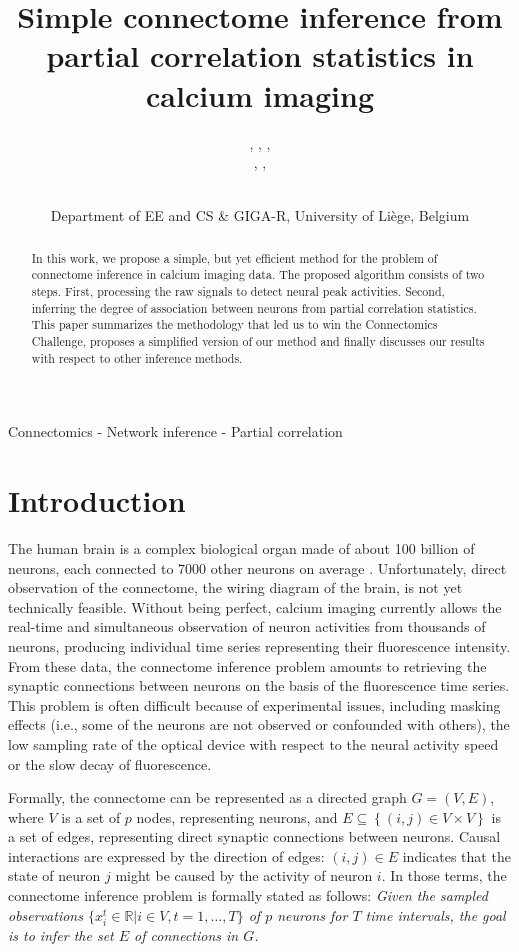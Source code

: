 \documentclass[wcp]{jmlr}
\title{Simple connectome inference from partial correlation statistics in calcium imaging}
\author{\Name{Antonio Sutera},
   \Name{Arnaud Joly},
   \Name{Vincent François-Lavet}, \Email{a.sutera@ulg.ac.be}\\
   \Name{Zixiao Aaron Qiu},
   \Name{Gilles Louppe},
   \Name{Damien Ernst}\and\Name{Pierre Geurts}
    \\
   \addr Department of EE and CS \& GIGA-R, University of Li\`ege, Belgium}
\begin{document}
\maketitle

\vspace{-0.8cm}
\begin{abstract}
In this work, we propose a simple, but yet efficient method for the problem of
connectome inference in calcium imaging data. The proposed algorithm consists of
two steps. First, processing the raw signals to detect neural peak activities.
Second, inferring the degree of association between neurons from partial
correlation statistics. This paper summarizes the methodology that led us to
win the Connectomics Challenge, proposes a simplified version of our method and
finally discusses our results with respect to other inference methods.
\end{abstract}

\begin{keywords}
Connectomics - Network inference - Partial correlation
\end{keywords}


\section{Introduction}\label{sec:intro}

The human brain is a complex biological
organ made of about 100 billion of neurons, each connected to 7000 other neurons on
average \citep{pakkenberg2003aging}. Unfortunately, direct observation of the connectome, the wiring
diagram of the brain, is not yet technically feasible. Without being perfect,
calcium imaging currently allows the real-time and simultaneous observation of
neuron activities from thousands of neurons, producing individual time series
representing their fluorescence intensity. From these data, the connectome
inference problem amounts to retrieving the synaptic connections between
neurons on the basis of the fluorescence time series. This
problem is often difficult because of experimental issues, including
masking effects (i.e., some of the neurons are not observed or confounded with others), the low sampling rate of the optical device with respect to the
neural activity speed or the slow decay of fluorescence.

Formally, the connectome can be represented as a directed graph $G=(V,E)$,
where $V$ is a set of $p$ nodes, representing neurons, and $E \subseteq
\left\{(i, j) \in V \times V\right\}$ is a set of edges, representing direct
synaptic connections between neurons. Causal interactions are expressed by the
direction of edges: $(i, j) \in E$ indicates that the state of neuron $j$ might
be caused by the activity of neuron $i$. In those terms,  the connectome
inference problem is formally stated as follows:  \textit{Given the sampled
observations $\{ x^t_i \in \mathbb{R} | i \in V, t = 1, \dots, T \}$ of $p$
neurons for $T$ time intervals, the goal is to infer the set $E$ of connections
in $G$.}
\end{document}
